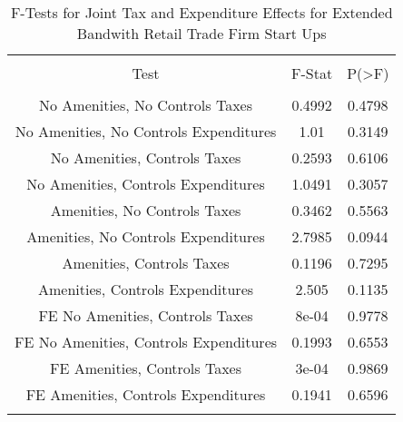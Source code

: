 
\begin{table}[!htbp] \centering 
  \caption{F-Tests for Joint Tax and Expenditure Effects for Extended Bandwith Retail Trade Firm Start Ups} 
  \label{44-45Ftests} 
\begin{tabular}{@{\extracolsep{5pt}} ccc} 
\\[-1.8ex]\hline 
\hline \\[-1.8ex] 
Test & F-Stat & P(\textgreater F) \\ 
\hline \\[-1.8ex] 
No Amenities, No Controls Taxes & 0.4992 & 0.4798 \\ 
No Amenities, No Controls Expenditures & 1.01 & 0.3149 \\ 
No Amenities, Controls Taxes & 0.2593 & 0.6106 \\ 
No Amenities, Controls Expenditures & 1.0491 & 0.3057 \\ 
Amenities, No Controls Taxes & 0.3462 & 0.5563 \\ 
Amenities, No Controls Expenditures & 2.7985 & 0.0944 \\ 
Amenities, Controls Taxes & 0.1196 & 0.7295 \\ 
Amenities, Controls Expenditures & 2.505 & 0.1135 \\ 
FE No Amenities, Controls Taxes & 8e-04 & 0.9778 \\ 
FE No Amenities, Controls Expenditures & 0.1993 & 0.6553 \\ 
FE Amenities, Controls Taxes & 3e-04 & 0.9869 \\ 
FE Amenities, Controls Expenditures & 0.1941 & 0.6596 \\ 
\hline \\[-1.8ex] 
\end{tabular} 
\end{table} 
